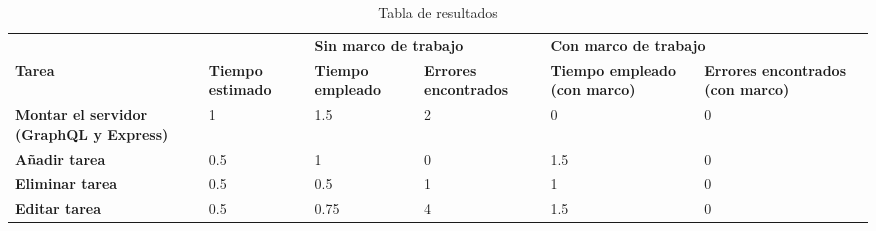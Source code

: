 \begin{table}[]
\centering
\caption{Tabla de resultados}
\begin{adjustbox}{width=\columnwidth,center}
\begin{tabular}{llllll}
{\color[HTML]{000000} }                                                & {\color[HTML]{000000} }                         & \multicolumn{2}{l}{{\color[HTML]{000000} \textbf{Sin marco de trabajo}}}                              & \multicolumn{2}{l}{{\color[HTML]{000000} \textbf{Con marco de trabajo}}}                                                      \\
{\color[HTML]{000000} \textbf{Tarea}}                                  & {\color[HTML]{000000} \textbf{Tiempo estimado}} & {\color[HTML]{000000} \textbf{Tiempo empleado}} & {\color[HTML]{000000} \textbf{Errores encontrados}} & {\color[HTML]{000000} \textbf{Tiempo empleado (con marco)}} & {\color[HTML]{000000} \textbf{Errores encontrados (con marco)}} \\
{\color[HTML]{000000} \textbf{Montar el servidor (GraphQL y Express)}} & {\color[HTML]{000000} 1}                        & {\color[HTML]{000000} 1.5}                      & {\color[HTML]{000000} 2}                            & {\color[HTML]{000000} 0}                                    & {\color[HTML]{000000} 0}                                        \\
{\color[HTML]{000000} \textbf{Añadir tarea}}                           & {\color[HTML]{000000} 0.5}                      & {\color[HTML]{000000} 1}                        & {\color[HTML]{000000} 0}                            & {\color[HTML]{000000} 1.5}                                  & {\color[HTML]{000000} 0}                                        \\
{\color[HTML]{000000} \textbf{Eliminar tarea}}                         & {\color[HTML]{000000} 0.5}                      & {\color[HTML]{000000} 0.5}                      & {\color[HTML]{000000} 1}                            & {\color[HTML]{000000} 1}                                    & {\color[HTML]{000000} 0}                                        \\
{\color[HTML]{000000} \textbf{Editar tarea}}                           & {\color[HTML]{000000} 0.5}                      & {\color[HTML]{000000} 0.75}                     & {\color[HTML]{000000} 4}                            & {\color[HTML]{000000} 1.5}                                  & {\color[HTML]{000000} 0}                                        \\

\end{tabular}
\end{adjustbox}
\end{table}
